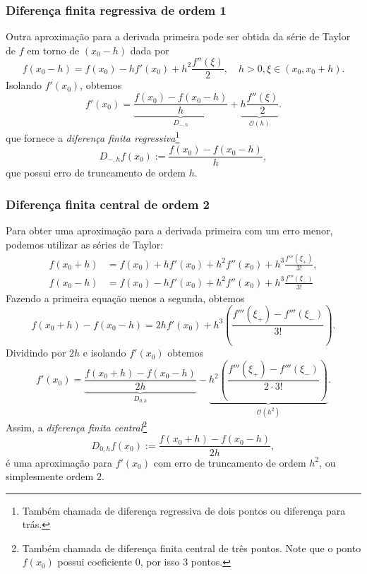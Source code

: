\subsubsection{Diferença finita regressiva de ordem 1}
Outra aproximação para a derivada primeira pode ser obtida da série de Taylor de $f$ em torno de $(x_0-h)$ dada por
\begin{equation}
  f(x_0-h) = f(x_0) - hf'(x_0) + h^2\frac{f''(\xi)}{2},\quad h>0, \xi\in(x_0, x_0+h).
\end{equation}
Isolando $f'(x_0)$, obtemos
\begin{equation}
  f'(x_0) = \underbrace{\frac{f(x_0) - f(x_0-h)}{h}}_{D_{-,h}} + \underbrace{h\frac{f''(\xi)}{2}}_{\mathcal{O}(h)}.
\end{equation}
que fornece a \emph{diferença finita regressiva}\footnote{Também chamada de diferença regressiva de dois pontos ou diferença para trás.}
\begin{equation}
  D_{-,h}f(x_0) := \frac{f(x_0)-f(x_0-h)}{h},
\end{equation}
que possui erro de truncamento de ordem $h$.

\subsubsection{Diferença finita central de ordem 2}
Para obter uma aproximação para a derivada primeira com um erro menor, podemos utilizar as séries de Taylor:
\begin{eqnarray}
    f(x_0+h) &= f(x_0) + hf'(x_0) + h^2f''(x_0) + h^3\frac{f'''(\xi_{+})}{3!},\\
    f(x_0-h) &= f(x_0) - hf'(x_0) + h^2f''(x_0) + h^3\frac{f'''(\xi_{-})}{3!}
\end{eqnarray}
Fazendo a primeira equação menos a segunda, obtemos
\begin{equation}
  f(x_0+h)-f(x_0-h) = 2hf'(x_0) + h^{3}\left(\frac{f'''(\xi_{+}) - f'''(\xi_{-})}{3!}\right).
\end{equation}
Dividindo por $2h$ e isolando $f'(x_0)$ obtemos
\begin{equation}
  f'(x_0) = \underbrace{\frac{f(x_0+h) - f(x_0-h)}{2h}}_{D_{0,h}} - \underbrace{h^2\left(\frac{f'''(\xi_+) - f'''(\xi_-)}{2\cdot 3!}\right)}_{\mathcal{O}(h^2)}.
\end{equation}
Assim, a \emph{diferença finita central}\footnote{Também chamada de diferença finita central de três pontos. Note que o ponto $f(x_0)$ possui coeficiente $0$, por isso $3$ pontos.}
\begin{equation}
  D_{0,h}f(x_0) := \frac{f(x_0+h)-f(x_0-h)}{2h},
\end{equation}
é uma aproximação para $f'(x_0)$ com erro de truncamento de ordem $h^2$, ou simplesmente ordem $2$.

